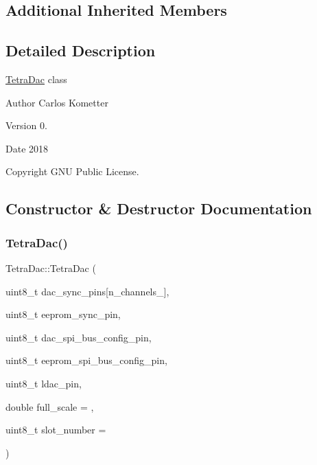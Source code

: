 \subsection*{Additional Inherited Members}


\subsection{Detailed Description}
\mbox{\hyperlink{classTetraDac}{Tetra\+Dac}} class \begin{DoxyAuthor}{Author}
Carlos Kometter 
\end{DoxyAuthor}
\begin{DoxyVersion}{Version}
0. 
\end{DoxyVersion}
\begin{DoxyDate}{Date}
2018 
\end{DoxyDate}
\begin{DoxyCopyright}{Copyright}
G\+NU Public License. 
\end{DoxyCopyright}


\subsection{Constructor \& Destructor Documentation}
\mbox{\label{classTetraDac_a77131270e115bf47b6c582d53cddb881}} 
\subsubsection{\texorpdfstring{Tetra\+Dac()}{TetraDac()}}
{\footnotesize\ttfamily Tetra\+Dac\+::\+Tetra\+Dac (\begin{DoxyParamCaption}\item[{uint8\+\_\+t}]{dac\+\_\+sync\+\_\+pins\mbox{[}n\+\_\+channels\+\_\+\mbox{]},  }\item[{uint8\+\_\+t}]{eeprom\+\_\+sync\+\_\+pin,  }\item[{uint8\+\_\+t}]{dac\+\_\+spi\+\_\+bus\+\_\+config\+\_\+pin,  }\item[{uint8\+\_\+t}]{eeprom\+\_\+spi\+\_\+bus\+\_\+config\+\_\+pin,  }\item[{uint8\+\_\+t}]{ldac\+\_\+pin,  }\item[{double}]{full\+\_\+scale = {},  }\item[{uint8\+\_\+t}]{slot\+\_\+number = {} }\end{DoxyParamCaption})}

